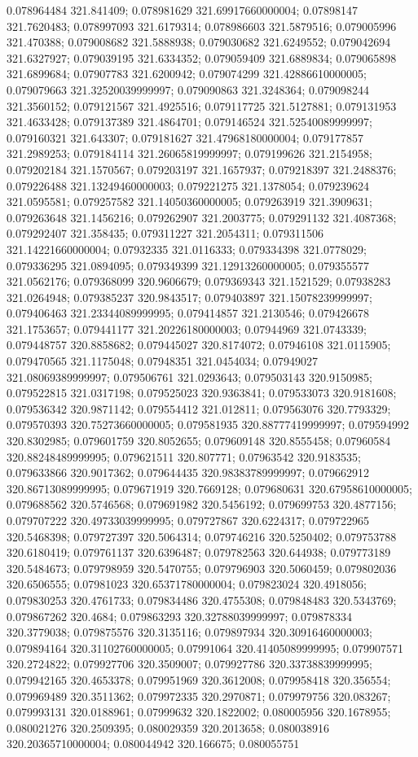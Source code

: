 0.078964484 321.841409; 0.078981629 321.69917660000004; 0.07898147 321.7620483; 0.078997093 321.6179314; 0.078986603 321.5879516; 0.079005996 321.470388; 0.079008682 321.5888938; 0.079030682 321.6249552; 0.079042694 321.6327927; 0.079039195 321.6334352; 0.079059409 321.6889834; 0.079065898 321.6899684; 0.07907783 321.6200942; 0.079074299 321.42886610000005; 0.079079663 321.32520039999997; 0.079090863 321.3248364; 0.079098244 321.3560152; 0.079121567 321.4925516; 0.079117725 321.5127881; 0.079131953 321.4633428; 0.079137389 321.4864701; 0.079146524 321.52540089999997; 0.079160321 321.643307; 0.079181627 321.47968180000004; 0.079177857 321.2989253; 0.079184114 321.26065819999997; 0.079199626 321.2154958; 0.079202184 321.1570567; 0.079203197 321.1657937; 0.079218397 321.2488376; 0.079226488 321.13249460000003; 0.079221275 321.1378054; 0.079239624 321.0595581; 0.079257582 321.14050360000005; 0.079263919 321.3909631; 0.079263648 321.1456216; 0.079262907 321.2003775; 0.079291132 321.4087368; 0.079292407 321.358435; 0.079311227 321.2054311; 0.079311506 321.14221660000004; 0.07932335 321.0116333; 0.079334398 321.0778029; 0.079336295 321.0894095; 0.079349399 321.12913260000005; 0.079355577 321.0562176; 0.079368099 320.9606679; 0.079369343 321.1521529; 0.07938283 321.0264948; 0.079385237 320.9843517; 0.079403897 321.15078239999997; 0.079406463 321.23344089999995; 0.079414857 321.2130546; 0.079426678 321.1753657; 0.079441177 321.20226180000003; 0.07944969 321.0743339; 0.079448757 320.8858682; 0.079445027 320.8174072; 0.07946108 321.0115905; 0.079470565 321.1175048; 0.07948351 321.0454034; 0.07949027 321.08069389999997; 0.079506761 321.0293643; 0.079503143 320.9150985; 0.079522815 321.0317198; 0.079525023 320.9363841; 0.079533073 320.9181608; 0.079536342 320.9871142; 0.079554412 321.012811; 0.079563076 320.7793329; 0.079570393 320.75273660000005; 0.079581935 320.88777419999997; 0.079594992 320.8302985; 0.079601759 320.8052655; 0.079609148 320.8555458; 0.07960584 320.88248489999995; 0.079621511 320.807771; 0.07963542 320.9183535; 0.079633866 320.9017362; 0.079644435 320.98383789999997; 0.079662912 320.86713089999995; 0.079671919 320.7669128; 0.079680631 320.67958610000005; 0.079688562 320.5746568; 0.079691982 320.5456192; 0.079699753 320.4877156; 0.079707222 320.49733039999995; 0.079727867 320.6224317; 0.079722965 320.5468398; 0.079727397 320.5064314; 0.079746216 320.5250402; 0.079753788 320.6180419; 0.079761137 320.6396487; 0.079782563 320.644938; 0.079773189 320.5484673; 0.079798959 320.5470755; 0.079796903 320.5060459; 0.079802036 320.6506555; 0.07981023 320.65371780000004; 0.079823024 320.4918056; 0.079830253 320.4761733; 0.079834486 320.4755308; 0.079848483 320.5343769; 0.079867262 320.4684; 0.079863293 320.32788039999997; 0.079878334 320.3779038; 0.079875576 320.3135116; 0.079897934 320.30916460000003; 0.079894164 320.31102760000005; 0.07991064 320.41405089999995; 0.079907571 320.2724822; 0.079927706 320.3509007; 0.079927786 320.33738839999995; 0.079942165 320.4653378; 0.079951969 320.3612008; 0.079958418 320.356554; 0.079969489 320.3511362; 0.079972335 320.2970871; 0.079979756 320.083267; 0.079993131 320.0188961; 0.07999632 320.1822002; 0.080005956 320.1678955; 0.080021276 320.2509395; 0.080029359 320.2013658; 0.080038916 320.20365710000004; 0.080044942 320.166675; 0.080055751 